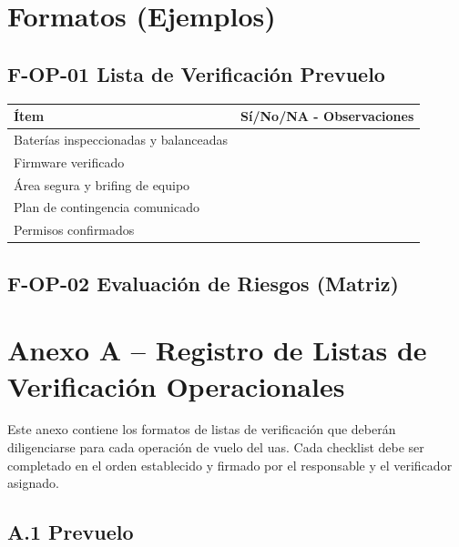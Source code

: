 \section*{Formatos (Ejemplos)}

\subsection*{F-OP-01 Lista de Verificación Prevuelo}
\begin{longtable}{@{}p{6cm}p{8cm}@{}}
\toprule
\textbf{Ítem} & \textbf{Sí/No/NA - Observaciones} \\ \midrule
Baterías inspeccionadas y balanceadas & \\
Firmware verificado & \\
Área segura y brifing de equipo & \\
Plan de contingencia comunicado & \\
Permisos confirmados & \\
\bottomrule
\end{longtable}

\subsection*{F-OP-02 Evaluación de Riesgos (Matriz)}

\section*{Anexo A – Registro de Listas de Verificación Operacionales}

Este anexo contiene los formatos de listas de verificación que deberán diligenciarse para cada operación de vuelo del \gls{uas}. Cada checklist debe ser completado en el orden establecido y firmado por el responsable y el verificador asignado.

\subsection*{A.1 Prevuelo}

